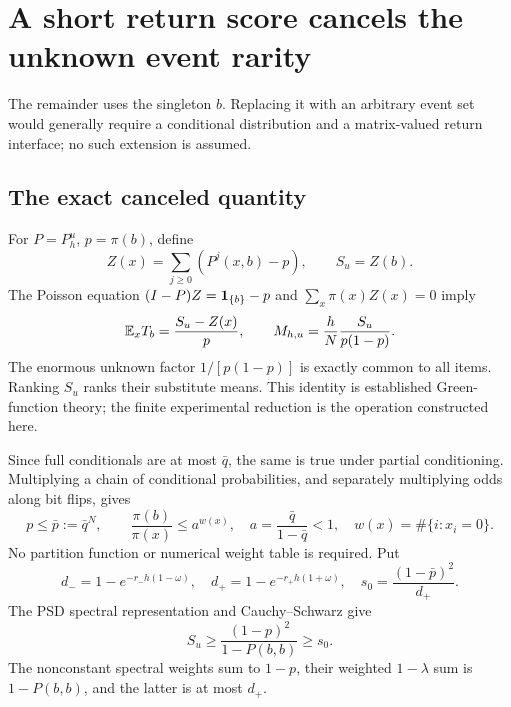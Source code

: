 \section{A short return score cancels the unknown event rarity}
\label{sec:return}
The remainder uses the singleton $b$. Replacing it with an arbitrary event set would generally require a conditional distribution and a matrix-valued return interface; no such extension is assumed.

\subsection{The exact canceled quantity}
For $P=P_h^u$, $p=\pi(b)$, define
\begin{equation}
 Z(x)=\sum_{j\ge0}(P^j(x,b)-p),\qquad S_u=Z(b).
 \label{eq:green}
\end{equation}
The Poisson equation $(I-P)Z=\mathbf 1_{\{b\}}-p$ and $\sum_x\pi(x)Z(x)=0$ imply
\begin{equation}
 \mathbb E_x T_b=\frac{S_u-Z(x)}p,\qquad
 M_{h,u}=\frac hN\frac{S_u}{p(1-p)}.
 \label{eq:cancel}
\end{equation}
The enormous unknown factor $1/[p(1-p)]$ is exactly common to all items. Ranking $S_u$ ranks their substitute means. This identity is established Green-function theory; the finite experimental reduction is the operation constructed here.

Since full conditionals are at most $\bar q$, the same is true under partial conditioning. Multiplying a chain of conditional probabilities, and separately multiplying odds along bit flips, gives
\begin{equation}
 p\le\bar p:=\bar q^N,\qquad
 \frac{\pi(b)}{\pi(x)}\le a^{w(x)},\quad
 a=\frac{\bar q}{1-\bar q}<1,\quad w(x)=\#\{i:x_i=0\}.
 \label{eq:massratio}
\end{equation}
No partition function or numerical weight table is required. Put
\begin{equation}
 d_-=1-e^{-r_-h(1-\omega)},\quad d_+=1-e^{-r_+h(1+\omega)},\quad
 s_0=\frac{(1-\bar p)^2}{d_+}.
 \label{eq:s0}
\end{equation}
The PSD spectral representation and Cauchy--Schwarz give
\begin{equation}
 S_u\ge\frac{(1-p)^2}{1-P(b,b)}\ge s_0.
 \label{eq:greenlower}
\end{equation}
The nonconstant spectral weights sum to $1-p$, their weighted $1-\lambda$ sum is $1-P(b,b)$, and the latter is at most $d_+$.

